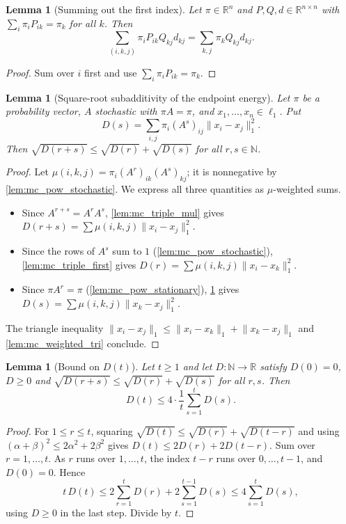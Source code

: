 \documentclass[11pt]{article}
\newtheorem{lemma}[theorem]{Lemma}
\theoremstyle{definition}
\theoremstyle{remark}
\newcommand{\R}{\mathbb{R}}
\newcommand{\N}{\mathbb{N}}
\newcommand{\lnorm}[1]{\lVert #1\rVert_{1}}
\begin{document}
\begin{lemma}[Summing out the first index]\label{lem:mc_triple_second}
Let $\pi\in\R^n$ and $P,Q,d\in\R^{n\times n}$ with $\sum_i\pi_iP_{ik}=\pi_k$ for all $k$. Then
\[
\sum_{(i,k,j)}\pi_iP_{ik}Q_{kj}d_{kj}=\sum_{k,j}\pi_kQ_{kj}d_{kj}.
\]
\end{lemma}
\begin{proof}
Sum over $i$ first and use $\sum_i\pi_iP_{ik}=\pi_k$.
\end{proof}

\begin{lemma}[Square-root subadditivity of the endpoint energy]\label{lem:mc_D_subadd}
Let $\pi$ be a probability vector, $A$ stochastic with $\pi A=\pi$, and $x_1,\dots,x_n\in\ell_1$. Put
\[
D(s)=\sum_{i,j}\pi_i(A^s)_{ij}\lnorm{x_i-x_j}^2 .
\]
Then $\sqrt{D(r+s)}\le\sqrt{D(r)}+\sqrt{D(s)}$ for all $r,s\in\N$.
\end{lemma}
\begin{proof}
Let $\mu(i,k,j)=\pi_i(A^r)_{ik}(A^s)_{kj}$; it is nonnegative by \cref{lem:mc_pow_stochastic}. We express all three quantities as $\mu$-weighted sums.
\begin{itemize}
\item Since $A^{r+s}=A^rA^s$, \cref{lem:mc_triple_mul} gives $D(r+s)=\sum\mu(i,k,j)\lnorm{x_i-x_j}^2$.
\item Since the rows of $A^s$ sum to $1$ (\cref{lem:mc_pow_stochastic}), \cref{lem:mc_triple_first} gives $D(r)=\sum\mu(i,k,j)\lnorm{x_i-x_k}^2$.
\item Since $\pi A^r=\pi$ (\cref{lem:mc_pow_stationary}), \cref{lem:mc_triple_second} gives $D(s)=\sum\mu(i,k,j)\lnorm{x_k-x_j}^2$.
\end{itemize}
The triangle inequality $\lnorm{x_i-x_j}\le\lnorm{x_i-x_k}+\lnorm{x_k-x_j}$ and \cref{lem:mc_weighted_tri} conclude.
\end{proof}

\begin{lemma}[Bound on $D(t)$]\label{lem:mc_cesaro_Dt}
Let $t\ge1$ and let $D:\N\to\R$ satisfy $D(0)=0$, $D\ge0$ and $\sqrt{D(r+s)}\le\sqrt{D(r)}+\sqrt{D(s)}$ for all $r,s$. Then
\[
D(t)\le4\cdot\frac1t\sum_{s=1}^tD(s).
\]
\end{lemma}
\begin{proof}
For $1\le r\le t$, squaring $\sqrt{D(t)}\le\sqrt{D(r)}+\sqrt{D(t-r)}$ and using $(\alpha+\beta)^2\le2\alpha^2+2\beta^2$ gives $D(t)\le2D(r)+2D(t-r)$. Sum over $r=1,\dots,t$. As $r$ runs over $1,\dots,t$, the index $t-r$ runs over $0,\dots,t-1$, and $D(0)=0$. Hence
\[
t\,D(t)\le2\sum_{r=1}^tD(r)+2\sum_{s=1}^{t-1}D(s)\le4\sum_{s=1}^tD(s),
\]
using $D\ge0$ in the last step. Divide by $t$.
\end{proof}
\end{document}
